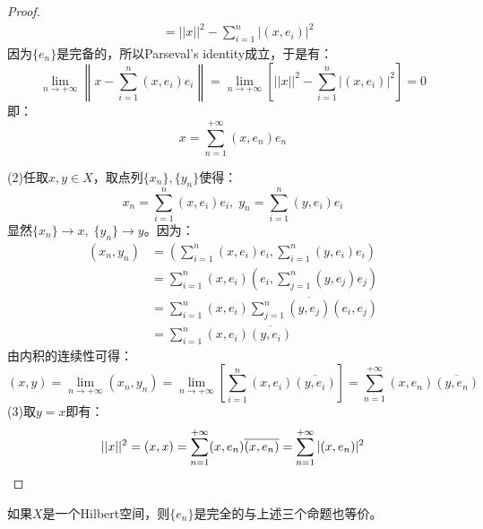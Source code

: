 \begin{proof}
\begin{align*}
		&=||x||^2-\sum_{i=1}^{n}|(x,e_i)|^2
	\end{align*}
	因为$\{e_n\}$是完备的，所以Parseval's identity成立，于是有：
	\begin{equation*}
		\lim_{n\to+\infty}\left\|x-\sum_{i=1}^{n}(x,e_i)e_i\right\|=\lim_{n\to+\infty}\left[||x||^2-\sum_{i=1}^{n}|(x,e_i)|^2\right]=0
	\end{equation*}
	即：
	\begin{equation*}
		x=\sum_{n=1}^{+\infty}(x,e_n)e_n
	\end{equation*}\par
	(2)任取$x,y\in X$，取点列$\{x_n\},\{y_n\}$使得：
	\begin{equation*}
		x_n=\sum_{i=1}^{n}(x,e_i)e_i,\;y_n=\sum_{i=1}^{n}(y,e_i)e_i
	\end{equation*}
	显然$\{x_n\}\to x,\;\{y_n\}\to y$。因为：
	\begin{align*}
		(x_n,y_n)
		&=\left(\sum_{i=1}^{n}(x,e_i)e_i,\sum_{i=1}^{n}(y,e_i)e_i\right) \\
		&=\sum_{i=1}^{n}(x,e_i)\left(e_i,\sum_{j=1}^{n}(y,e_j)e_j\right) \\
		&=\sum_{i=1}^{n}(x,e_i)\sum_{j=1}^{n}\overline{(y,e_j)}(e_i,e_j) \\
		&=\sum_{i=1}^{n}(x,e_i)\overline{(y,e_i)}
	\end{align*}
	由内积的连续性可得：
	\begin{equation*}
		(x,y)=\lim_{n\to+\infty}(x_n,y_n)=\lim_{n\to+\infty}\left[\sum_{i=1}^{n}(x,e_i)\overline{(y,e_i)}\right]=\sum_{n=1}^{+\infty}(x,e_n)\overline{(y,e_n)}
	\end{equation*}
	(3)取$y=x$即有：
	\begin{equation*}
		||x||^2=(x,x)=\sum_{n=1}^{+\infty}(x,e_n)\overline{(x,e_n)}=\sum_{n=1}^{+\infty}|(x,e_n)|^2\qedhere
	\end{equation*}
\end{proof}
\begin{theorem}
	如果$X$是一个Hilbert空间，则$\{e_n\}$是完全的与上述三个命题也等价。
\end{theorem}
